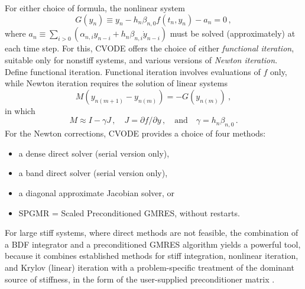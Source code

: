 For either choice of formula, the nonlinear system
\begin{equation}\label{NLS}
  G(y_n) \equiv y_n - h_n \beta_{n,0} f(t_n,y_n) - a_n = 0 \, ,
\end{equation}
where $a_n \equiv \sum_{i>0}(\alpha_{n,i} y_{n-i} + h_n \beta_{n,i} \dot{y}_{n-i})$ 
must be solved (approximately) at each time step.  For this, CVODE
offers the choice of either {\em functional iteration}, suitable only
for nonstiff systems, and various versions of {\em Newton iteration}.
{\sf Define functional iteration.}
Functional iteration involves evaluations of $f$ only, while Newton
iteration requires the solution of linear systems
\begin{equation}\label{Newtoncorr}
  M (y_{n(m+1)} - y_{n(m)}) = -G(y_{n(m)}) ~,
\end{equation}
in which
\begin{equation}\label{Newtonmat} 
  M \approx I - \gamma J \, , \quad J = \partial f / \partial y 
  \, ,\quad \mbox{and} \quad \gamma = h_n \beta_{n,0} \, . 
\end{equation}
For the Newton corrections, CVODE provides a choice of four methods:
\begin{itemize}
\item a dense direct solver (serial version only),
\item a band direct solver (serial version only),
\item a diagonal approximate Jacobian solver, or
\item SPGMR = Scaled Preconditioned GMRES, without restarts.
\end{itemize}
For large stiff systems, where direct methods are not feasible, the
combination of a BDF integrator and a preconditioned GMRES algorithm
yields a powerful tool, because it combines established methods for
stiff integration, nonlinear iteration, and Krylov (linear) iteration
with a problem-specific treatment of the dominant source of stiffness,
in the form of the user-supplied preconditioner matrix \cite{BrHi:89}.

